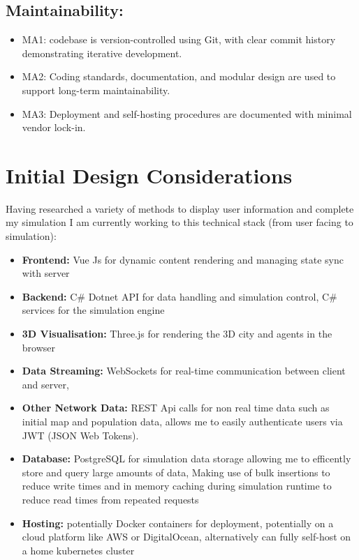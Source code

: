 \subsection{Maintainability:}
\begin{itemize}
    \item\label{req:MA1} MA1: codebase is version-controlled using Git, with clear commit history demonstrating iterative development.
    \item\label{req:MA2} MA2: Coding standards, documentation, and modular design are used to support long-term maintainability.
    \item \label{req:MA3} MA3: Deployment and self-hosting procedures are documented with minimal vendor lock-in.
\end{itemize}


\section{Initial Design Considerations}

Having researched a variety of methods to display user information and complete my simulation I am currently working to this technical stack (from user facing to simulation):
\begin{itemize}
    \item \textbf{Frontend:} Vue Js for dynamic content rendering and managing state sync with server
    \item \textbf{Backend:} C\# Dotnet API for data handling and simulation control, C\# services for the simulation engine
    \item \textbf{3D Visualisation:} Three.js for rendering the 3D city and agents in the browser
    \item \textbf{Data Streaming:} WebSockets for real-time communication between client and server,
    \item \textbf{Other Network Data:} REST Api calls for non real time data such as initial map and population data, allows me to easily authenticate users via JWT (JSON Web Tokens).
    \item \textbf{Database:} PostgreSQL for simulation data storage allowing me to efficently store and query large amounts of data, Making use of bulk insertions to reduce write times and in memory caching during simulation runtime to reduce read times from repeated requests
    \item \textbf{Hosting:} potentially Docker containers for deployment, potentially on a cloud platform like AWS or DigitalOcean, alternatively can fully self-host on a home kubernetes cluster
\end{itemize}

